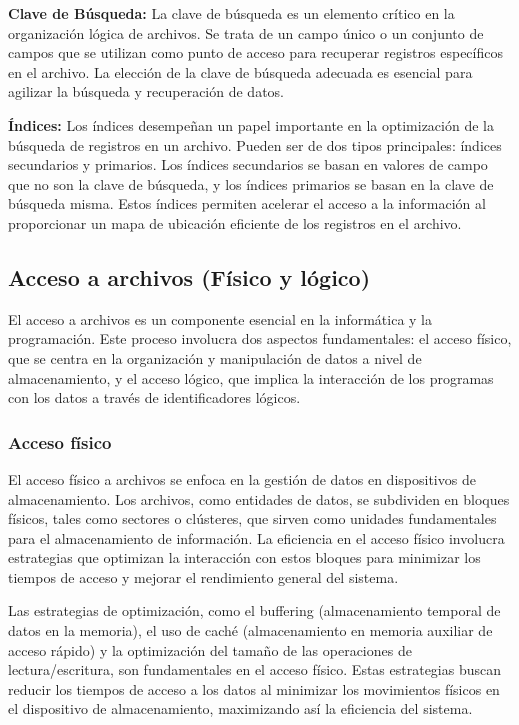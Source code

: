 \documentclass[11pt, twocolumn]{article}
\begin{document}
  \textbf{Clave de Búsqueda:} La clave de búsqueda es un elemento crítico en la organización lógica de archivos. Se trata de un campo único o un conjunto de campos que se utilizan como punto de acceso para recuperar registros específicos en el archivo. La elección de la clave de búsqueda adecuada es esencial para agilizar la búsqueda y recuperación de datos.

  \textbf{Índices:} Los índices desempeñan un papel importante en la optimización de la búsqueda de registros en un archivo. Pueden ser de dos tipos principales: índices secundarios y primarios. Los índices secundarios se basan en valores de campo que no son la clave de búsqueda, y los índices primarios se basan en la clave de búsqueda misma. Estos índices permiten acelerar el acceso a la información al proporcionar un mapa de ubicación eficiente de los registros en el archivo.

  \subsection{Acceso a archivos (Físico y lógico)}
  El acceso a archivos es un componente esencial en la informática y la programación. Este proceso involucra dos aspectos fundamentales: el acceso físico, que se centra en la organización y manipulación de datos a nivel de almacenamiento, y el acceso lógico, que implica la interacción de los programas con los datos a través de identificadores lógicos.

  \subsubsection*{Acceso físico}
  El acceso físico a archivos se enfoca en la gestión de datos en dispositivos de almacenamiento. Los archivos, como entidades de datos, se subdividen en bloques físicos, tales como sectores o clústeres, que sirven como unidades fundamentales para el almacenamiento de información. La eficiencia en el acceso físico involucra estrategias que optimizan la interacción con estos bloques para minimizar los tiempos de acceso y mejorar el rendimiento general del sistema.

  Las estrategias de optimización, como el buffering (almacenamiento temporal de datos en la memoria), el uso de caché (almacenamiento en memoria auxiliar de acceso rápido) y la optimización del tamaño de las operaciones de lectura/escritura, son fundamentales en el acceso físico. Estas estrategias buscan reducir los tiempos de acceso a los datos al minimizar los movimientos físicos en el dispositivo de almacenamiento, maximizando así la eficiencia del sistema.
\end{document}
